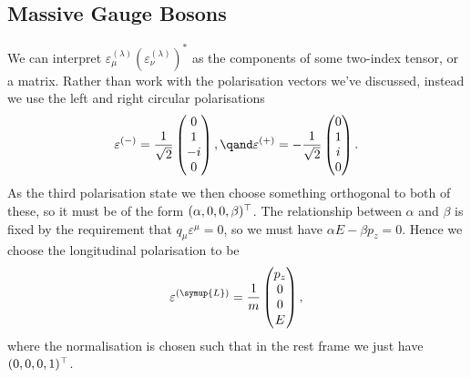 \subsection{Massive Gauge Bosons}
We can interpret \(\varepsilon^{(\lambda)}_\mu(\varepsilon^{(\lambda)}_\nu)^*\) as the components of some two-index tensor, or a matrix.
Rather than work with the polarisation vectors we've discussed, instead we use the left and right circular polarisations
\begin{equation}
    \varepsilon^{(-)} = \frac{1}{\sqrt{2}}
    \begin{pmatrix}
        0\\ 1\\ -i\\ 0
    \end{pmatrix}
    , \qand 
    \varepsilon^{(+)} = -\frac{1}{\sqrt{2}}
    \begin{pmatrix}
        0\\ 1\\ i\\ 0
    \end{pmatrix}
    .
\end{equation}
As the third polarisation state we then choose something orthogonal to both of these, so it must be of the form \((\alpha, 0, 0, \beta)^\top\).
The relationship between \(\alpha\) and \(\beta\) is fixed by the requirement that \(q_\mu \varepsilon^\mu = 0\), so we must have \(\alpha E - \beta p_z = 0\).
Hence we choose the longitudinal polarisation to be
\begin{equation}
    \varepsilon^{(\symup{L})} = \frac{1}{m}
    \begin{pmatrix}
        p_z\\ 0\\ 0\\ E
    \end{pmatrix}
    ,
\end{equation}
where the normalisation is chosen such that in the rest frame we just have \((0, 0, 0, 1)^\top\).

